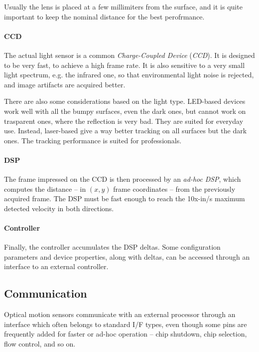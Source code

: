 \documentclass[a4paper,10pt]{article}
\begin{document}
\begin{multicols}{2}
Usually the lens is placed at a few millimiters from the surface, and
it is quite important to keep the nominal distance for the best perofrmance.


\paragraph{CCD}
The actual light sensor is a common \emph{Charge-Coupled Device}
(\emph{CCD}). It is designed to be very fast, to achieve a high frame rate.
It is also sensitive to a very small light spectrum, e.g. the infrared one,
so that environmental light noise is rejected, and image artifacts are acquired
better.

There are also some considerations based on the light type. LED-based devices
work well with all the bumpy surfaces, even the dark ones, but cannot work
on trasparent ones, where the reflection is very bad. They are suited for
everyday use.
Instead, laser-based give a way better tracking on all surfaces but the dark
ones. The tracking performance is suited for professionals.


\paragraph{DSP}
The frame impressed on the CCD is then processed by an \emph{ad-hoc}
\emph{DSP}, which computes the distance -- in $(x,y)$ frame coordinates --
from the previously acquired frame. The DSP must be fast enough to reach the
10x-in/s maximum detected velocity in both directions.


\paragraph{Controller}
Finally, the controller accumulates the DSP deltas. Some configuration
parameters and device properties, along with deltas, can be accessed through
an interface to an external controller.


\subsection{Communication}

Optical motion sensors communicate with an external processor through an
interface which often belongs to standard I/F types, even though some pins
are frequently added for faster or ad-hoc operation -- chip shutdown, chip
selection, flow control, and so on.



\end{multicols}
\end{document}
